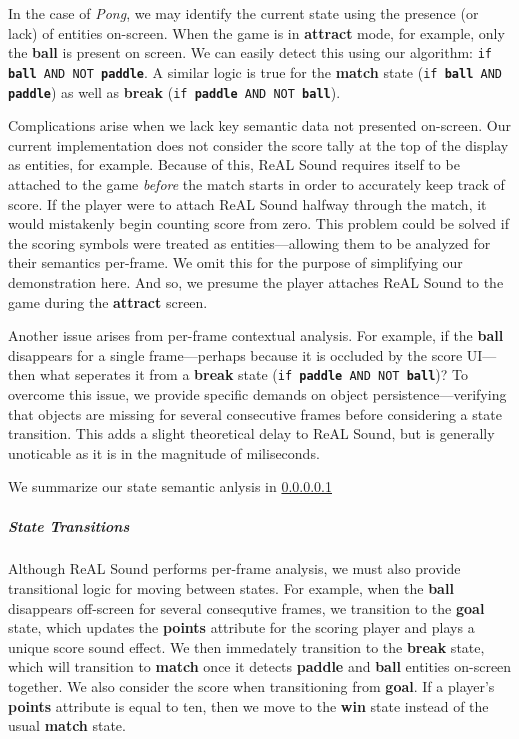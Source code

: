 \documentclass{report}
\newcommand{\rs}{ReAL Sound\xspace}
\newcommand{\state}[1]{\textbf{#1}}
\newcommand{\pad}{\textbf{paddle}\xspace}
\newcommand{\ball}{\textbf{ball}\xspace}
\newcommand{\tech}[1]{\textbf{#1}}
\begin{document}
In the case of \emph{Pong}, we may identify the current state using the presence (or lack) of entities on-screen. When the game is in \state{attract} mode, for example, only the \ball is present on screen. We can easily detect this using our algorithm: \texttt{if \ball AND NOT \pad}. A similar logic is true for the \state{match} state (\texttt{if \ball AND \pad}) as well as \state{break} (\texttt{if \pad AND NOT \ball}). 

Complications arise when we lack key semantic data not presented on-screen. Our current implementation does not consider the score tally at the top of the display as entities, for example. Because of this, \rs requires itself to be attached to the game \emph{before} the match starts in order to accurately keep track of score. If the player were to attach \rs halfway through the match, it would mistakenly begin counting score from zero. This problem could be solved if the scoring symbols were treated as entities---allowing them to be analyzed for their semantics per-frame. We omit this for the purpose of simplifying our demonstration here. And so, we presume the player attaches \rs to the game during the \state{attract} screen. 

Another issue arises from per-frame contextual analysis. For example, if the \ball disappears for a single frame---perhaps because it is occluded by the score UI---then what seperates it from a \state{break} state (\texttt{if \pad AND NOT \ball})? To overcome this issue, we provide specific demands on object persistence---verifying that objects are missing for several consecutive frames before considering a state transition. This adds a slight theoretical delay to \rs, but is generally unoticable as it is in the magnitude of miliseconds.

We summarize our state semantic anlysis in \ref{}


\subparagraph{State Transitions}
Although \rs performs per-frame analysis, we must also provide transitional logic for moving between states. For example, when the \ball disappears off-screen for several consequtive frames, we transition to the \state{goal} state, which updates the \tech{points} attribute for the scoring player and plays a unique score sound effect. We then immedately transition to the \state{break} state, which will transition to \state{match} once it detects \pad and \ball entities on-screen together. We also consider the score when transitioning from \state{goal}. If a player's \state{points} attribute is equal to ten, then we move to the \state{win} state instead of the usual \state{match} state.
\end{document}
